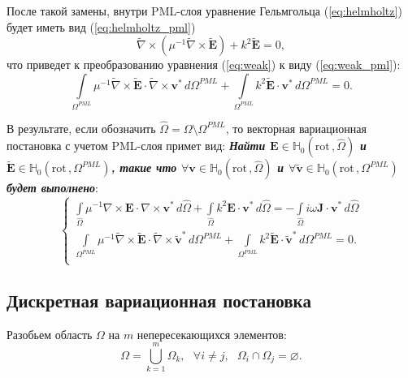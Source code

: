 \documentclass[a4paper,14pt]{article}
\begin{document}
После такой замены, внутри PML-слоя уравнение Гельмгольца (\ref{eq:helmholtz}) будет иметь вид (\ref{eq:helmholtz_pml})
\begin{equation}
	\tilde{\nabla} \times ( \mu^{-1} \tilde{\nabla} \times \tilde{\mathbf{E}} ) + k^{2} \tilde{\mathbf{E}} = 0 , \label{eq:helmholtz_pml}
\end{equation}
что приведет к преобразованию уравнения (\ref{eq:weak}) к виду (\ref{eq:weak_pml}):
\begin{equation}
	\int\limits_{{\Omega^{PML}}} \mu^{-1} \tilde{\nabla} \times \tilde{\mathbf{E}} \cdot \tilde{\nabla} \times \mathbf{v}^{*} \,d{\Omega^{PML}} + \int\limits_{{\Omega^{PML}}} k^{2} \tilde{\mathbf{E}} \cdot \mathbf{v}^{*} \,d{\Omega^{PML}} = 0 . \label{eq:weak_pml}
\end{equation}

В результате, если обозначить $\widehat{\Omega} = \Omega \setminus {\Omega^{PML}}$, то векторная вариационная постановка с учетом PML-слоя примет вид: \textbf{\textit{Найти $\mathbf{E} \in \mathbb{H}_{0}( \mathrm{rot}\,, \widehat{\Omega} )$ и  $\tilde{\mathbf{E}} \in \mathbb{H}_{0}( \mathrm{rot}\,, {\Omega^{PML}} )$, такие что $\forall \mathbf{v} \in \mathbb{H}_{0}( \mathrm{rot}\,, \widehat{\Omega} )$ и $\forall \tilde{\mathbf{v}} \in \mathbb{H}_{0}( \mathrm{rot}\,, {\Omega^{PML}} )$ будет выполнено}}:
\begin{equation*}
	\begin{cases}
		\displaystyle
		\int\limits_{\widehat{\Omega}} \mu^{-1} \nabla \times \mathbf{E} \cdot \nabla \times \mathbf{v}^{*} \,d\widehat{\Omega} + \int\limits_{\widehat{\Omega}} k^{2} \mathbf{E} \cdot \mathbf{v}^{*} \,d\widehat{\Omega} = - \int\limits_{\widehat{\Omega}} i \omega \mathbf{J} \cdot \mathbf{v}^{*} \,d\widehat{\Omega} \\
		\displaystyle
		\int\limits_{{\Omega^{PML}}} \mu^{-1} \tilde{\nabla} \times \tilde{\mathbf{E}} \cdot \tilde{\nabla} \times \tilde{\mathbf{v}}^{*} \,d{\Omega^{PML}} + \int\limits_{{\Omega^{PML}}} k^{2} \tilde{\mathbf{E}} \cdot \tilde{\mathbf{v}}^{*} \,d{\Omega^{PML}} = 0 . \\
	\end{cases}
\end{equation*}


\subsection{Дискретная вариационная постановка}
Разобьем область $\Omega$ на $m$ непересекающихся элементов:
\begin{equation*}
	\Omega = \bigcup\limits_{k=1}^{m} \Omega_k , \text{~~} \forall i \neq j , \text{~~} \Omega_i \cap \Omega_j = \varnothing .
\end{equation*}
\end{document}
